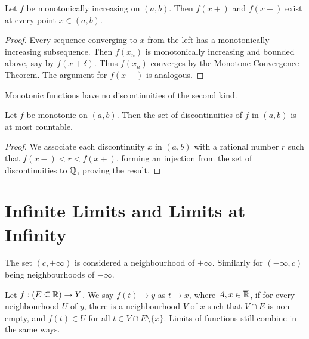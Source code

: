 \begin{theorem} %
    Let $f$ be monotonically increasing on $(a, b)$. Then $f(x+)$ and $f(x-)$ exist at every point $x \in (a, b)$.
\begin{proof}
    Every sequence converging to $x$ from the left has a monotonically increasing subsequence. Then $f(x_n)$ is monotonically increasing and bounded above, say by $f(x+\delta)$. Thus $f(x_n)$ converges by the Monotone Convergence Theorem. The argument for $f(x+)$ is analogous.
\end{proof}
\end{theorem}

\begin{corollary}
Monotonic functions have no discontinuities of the second kind.
\end{corollary}

\begin{theorem} %
    Let $f$ be monotonic on $(a, b)$. Then the set of discontinuities of $f$ in $(a, b)$ is at most countable.
\begin{proof}
    We associate each discontinuity $x$ in $(a, b)$ with a rational number $r$ such that $f(x-) < r < f(x+)$, forming an injection from the set of discontinuities to $\mathbb{Q}$, proving the result.
\end{proof}
\end{theorem}

\section{Infinite Limits and Limits at Infinity}

\begin{definition} %
    The set $(c, +\infty)$ is considered a neighbourhood of $+\infty$. Similarly for $(-\infty, c)$ being neighbourhoods of $-\infty$.
\end{definition}

\begin{definition} %
    Let $f: (E \subseteq \mathbb{R}) \rightarrow Y$. We say $f(t) \to y$ as $t \to x$, where $A, x \in \overline{\mathbb{R}}$, if for every neighbourhood $U$ of $y$, there is a neighbourhood $V$ of $x$ such that $V \cap E$ is non-empty, and $f(t) \in U$ for all $t \in V \cap E \setminus \{x\}$. Limits of functions still combine in the same ways. 
\end{definition}

